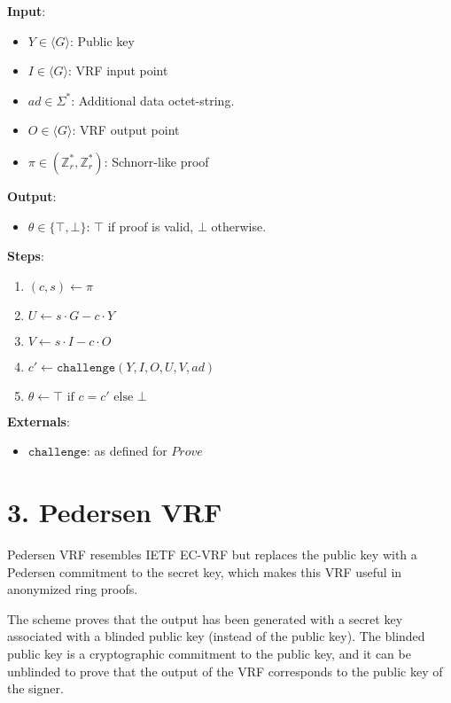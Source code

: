 \documentclass[
]{article}
\providecommand{\tightlist}{%
  \setlength{\itemsep}{0pt}\setlength{\parskip}{0pt}}
\begin{document}
\textbf{Input}:

\begin{itemize}
\tightlist
\item
  \(Y \in \langle G \rangle\): Public key
\item
  \(I \in \langle G \rangle\): VRF input point
\item
  \(ad \in \Sigma^*\): Additional data octet-string.
\item
  \(O \in \langle G \rangle\): VRF output point
\item
  \(\pi \in (\mathbb{Z}^*_r, \mathbb{Z}^*_r)\): Schnorr-like proof
\end{itemize}

\textbf{Output}:

\begin{itemize}
\tightlist
\item
  \(\theta \in \{ \top, \bot \}\): \(\top\) if proof is valid, \(\bot\)
  otherwise.
\end{itemize}

\textbf{Steps}:

\begin{enumerate}
\def\labelenumi{\arabic{enumi}.}
\tightlist
\item
  \((c, s) \gets \pi\)
\item
  \(U \gets s \cdot G - c \cdot Y\)
\item
  \(V \gets s \cdot I - c \cdot O\)
\item
  \(c' \gets \texttt{challenge}(Y, I, O, U, V, ad)\)
\item
  \(\theta \gets \top \text{ if } c = c' \text{ else } \bot\)
\end{enumerate}

\textbf{Externals}:

\begin{itemize}
\tightlist
\item
  \(\texttt{challenge}\): as defined for \(Prove\)
\end{itemize}

\section{3. Pedersen VRF}\label{pedersen-vrf}

Pedersen VRF resembles IETF EC-VRF but replaces the public key with a
Pedersen commitment to the secret key, which makes this VRF useful in
anonymized ring proofs.

The scheme proves that the output has been generated with a secret key
associated with a blinded public key (instead of the public key). The
blinded public key is a cryptographic commitment to the public key, and
it can be unblinded to prove that the output of the VRF corresponds to
the public key of the signer.
\end{document}
